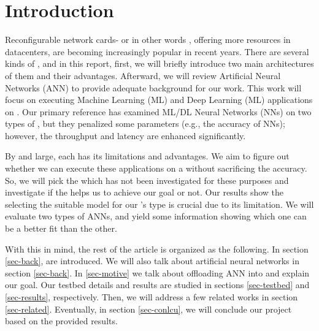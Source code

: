 \section{Introduction}
Reconfigurable network cards- or in other words \smartnics, offering more resources in datacenters, are becoming increasingly popular in recent years. There are several kinds of \smartnic, and in this report, first, we will briefly introduce two main architectures of them and their advantages. Afterward, we will review Artificial Neural Networks (ANN) to provide adequate background for our work. This work will focus on executing Machine Learning (ML) and Deep Learning (ML) applications on \smartnics. Our primary reference \cite{siracusano2020running} has examined ML/DL Neural Networks (NNs) on two types of \smartnics, but they penalized some parameters (e.g., the accuracy of NNs); however, the throughput and latency are enhanced significantly.
\par
By and large, each \smartnic has its limitations and advantages. We aim to figure out whether we can execute these applications on a \smartnic without sacrificing the accuracy. So, we will pick the \smartnic which has not been investigated for these purposes and investigate if the \smartnic helps us to achieve our goal or not. Our results show the selecting the suitable model for our \smartnic's type is crucial due to its limitation. We will evaluate two types of ANNs, and yield some information showing which one can be a better fit than the other.

\par
With this in mind, the rest of the article is organized as the following. In section \ref{sec-back}, \smartnics are introduced. We will also talk about artificial neural networks in section \ref{sec-back}. In \ref{sec-motive} we talk about offloading ANN into \smartnics and explain our goal. Our testbed details and results are studied in sections \ref{sec-testbed} and \ref{sec-results}, respectively. Then, we will address a few related works in section \ref{sec-related}. Eventually, in section \ref{sec-conlcu}, we will conclude our project based on the provided results.